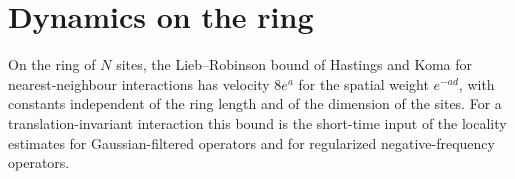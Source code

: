 \chapter{Dynamics on the ring}
\label{ch:ring_dynamics}

On the ring of $N$ sites, the Lieb--Robinson bound of Hastings and Koma for
nearest-neighbour interactions has velocity $8e^a$ for the spatial weight
$e^{-a d}$, with constants independent of the ring length and of the dimension
of the sites. For a translation-invariant interaction this bound is the
short-time input of the locality estimates for Gaussian-filtered operators and
for regularized negative-frequency operators.



